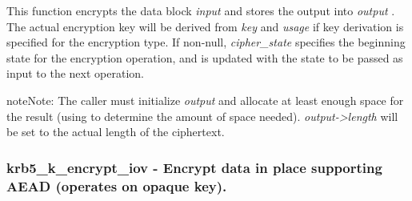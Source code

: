 \documentclass[letterpaper,10pt,english]{sphinxmanual}
\begin{document}
This function encrypts the data block \emph{input} and stores the output into \emph{output} . The actual encryption key will be derived from \emph{key} and \emph{usage} if key derivation is specified for the encryption type. If non-null, \emph{cipher\_state} specifies the beginning state for the encryption operation, and is updated with the state to be passed as input to the next operation.

\begin{notice}{note}{Note:}
The caller must initialize \emph{output} and allocate at least enough space for the result (using {\hyperref[appdev/refs/api/krb5_c_encrypt_length:c.krb5_c_encrypt_length]{}} to determine the amount of space needed). \emph{output-\textgreater{}length} will be set to the actual length of the ciphertext.
\end{notice}


\subsubsection{krb5\_k\_encrypt\_iov -  Encrypt data in place supporting AEAD (operates on opaque key).}
\label{appdev/refs/api/krb5_k_encrypt_iov::doc}\label{appdev/refs/api/krb5_k_encrypt_iov:krb5-k-encrypt-iov-encrypt-data-in-place-supporting-aead-operates-on-opaque-key}

\begin{fulllineitems}
\label{appdev/refs/api/krb5_k_encrypt_iov:c.krb5_k_encrypt_iov}
\end{fulllineitems}
\end{document}
